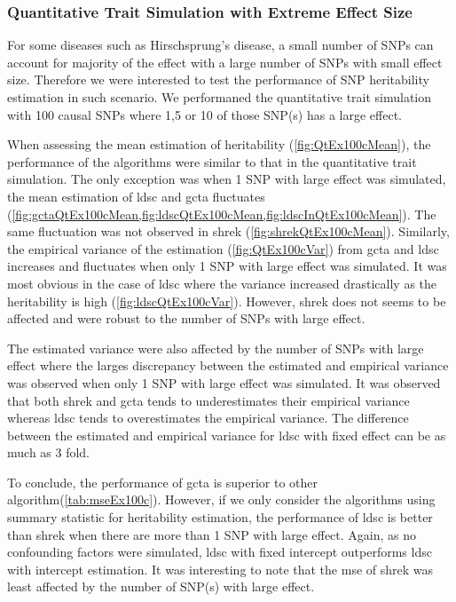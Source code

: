 		
		
		\subsubsection{Quantitative Trait Simulation with Extreme Effect Size}
		
		For some diseases such as Hirschsprung's disease, a small number of \glspl{SNP} can account for majority of the effect with a large number of \glspl{SNP} with small effect size. 
		Therefore we were interested to test the performance of \gls{SNP} heritability estimation in such scenario.
		We performaned the quantitative trait simulation with 100 causal \glspl{SNP} where 1,5 or 10 of those \gls{SNP}(s) has a large effect.
		
		When assessing the mean estimation of heritability (\cref{fig:QtEx100cMean}), the performance of the algorithms were similar to that in the quantitative trait simulation.
		The only exception was when 1 \gls{SNP} with large effect was simulated, the mean estimation of \gls{ldsc} and \gls{gcta} fluctuates (\cref{fig:gctaQtEx100cMean,fig:ldscQtEx100cMean,fig:ldscInQtEx100cMean}).
		The same fluctuation was not observed in \gls{shrek} (\cref{fig:shrekQtEx100cMean}). 
		Similarly, the empirical variance of the estimation (\cref{fig:QtEx100cVar}) from \gls{gcta} and \gls{ldsc} increases and fluctuates when only 1 \gls{SNP} with large effect was simulated.
		It was most obvious in the case of \gls{ldsc} where the variance increased drastically as the heritability is high (\cref{fig:ldscQtEx100cVar}).
		However, \gls{shrek} does not seems to be affected and were robust to the number of \glspl{SNP} with large effect. 
		
		The estimated variance were also affected by the number of \glspl{SNP} with large effect where the larges discrepancy between the estimated and empirical variance was observed when only 1 \gls{SNP} with large effect was simulated. 
		It was observed that both \gls{shrek} and \gls{gcta} tends to underestimates their empirical variance whereas \gls{ldsc} tends to overestimates the empirical variance. 
		The difference between the estimated and empirical variance for \gls{ldsc} with fixed effect can be as much as 3 fold. 
		
		To conclude, the performance of \gls{gcta} is superior to other algorithm(\cref{tab:mseEx100c}).
		However, if we only consider the algorithms using summary statistic for heritability estimation, the performance of \gls{ldsc} is better than \gls{shrek} when there are more than 1 \gls{SNP} with large effect. 
		Again, as no confounding factors were simulated, \gls{ldsc} with fixed intercept outperforms \gls{ldsc} with intercept estimation.
		It was interesting to note that the \gls{mse} of \gls{shrek} was least affected by the number of \gls{SNP}(s) with large effect.
		   
